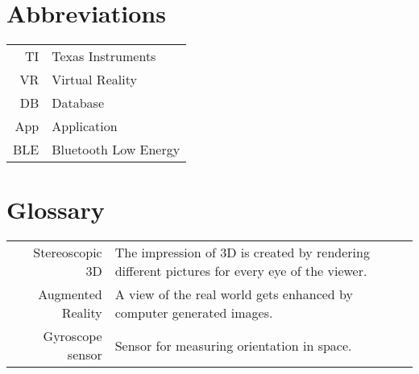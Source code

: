 \section{Abbreviations}

\begin{tabular}{rl}
TI & Texas Instruments\\
VR & Virtual Reality\\
DB & Database\\
App & Application\\
BLE & Bluetooth Low Energy\\

\end{tabular}
\bigskip

\section{Glossary}

\begin{tabular}{r p{11cm}}
Stereoscopic 3D & The impression of 3D is created by rendering different pictures for every eye of the viewer.\\
Augmented Reality & A view of the real world gets enhanced by computer generated images.\\
Gyroscope sensor & Sensor for measuring orientation in space.\\
\end{tabular}